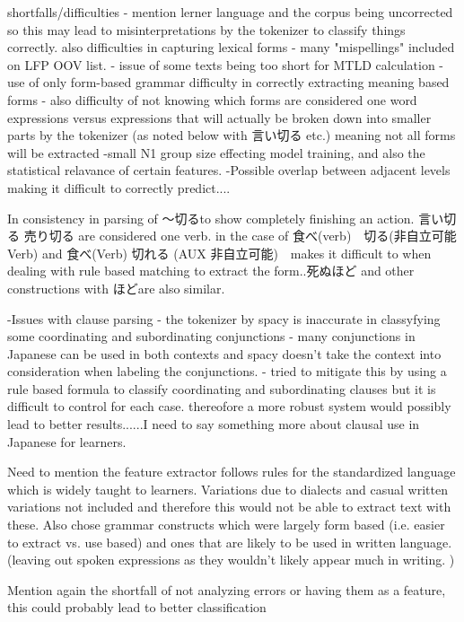 


shortfalls/difficulties
- mention lerner language and the corpus being uncorrected so this may lead to misinterpretations by the tokenizer to classify things correctly.
    also difficulties in capturing lexical forms - many "mispellings" included on LFP OOV list.
- issue of some texts being too short for MTLD calculation
- use of only form-based grammar difficulty in correctly extracting meaning based forms
- also difficulty of not knowing which forms are considered one word expressions versus expressions that will
actually be broken down into smaller parts by the tokenizer (as noted below with 言い切る etc.) meaning not all forms
will be extracted
-small N1 group size effecting model training, and also the statistical relavance of certain features.
-Possible overlap between adjacent levels making it difficult to correctly predict....

In consistency in parsing of 〜切るto show completely finishing an action. 言い切る 売り切る are considered one verb. in the
case of 食べ(verb)　切る(非自立可能Verb) and 食べ(Verb) 切れる (AUX 非自立可能)　makes it difficult to when dealing with rule based
matching to extract the form..死ぬほど and other constructions with ほどare also similar.

-Issues with clause parsing - the tokenizer by spacy is inaccurate in classyfying some coordinating and
subordinating conjunctions - many conjunctions in Japanese can be used in both contexts and spacy doesn't take the
context into consideration when labeling the conjunctions. - tried to mitigate this by using a rule based formula to
classify coordinating and subordinating clauses but it is difficult to control for each case. thereofore a more
robust system would possibly lead to better results......I need to say something more about clausal use in Japanese
for learners.


Need to mention the feature extractor follows rules for the standardized language which is widely taught to
learners. Variations due to dialects and casual written variations not included and therefore this would not be
able to extract text with these. Also chose grammar constructs which were largely form based (i.e. easier to extract
vs. use based) and ones that are likely to be used in written language. (leaving out spoken expressions as they
wouldn't likely appear much in writing. )

Mention again the shortfall of not analyzing errors or having them as a feature, this could probably lead to better
classification